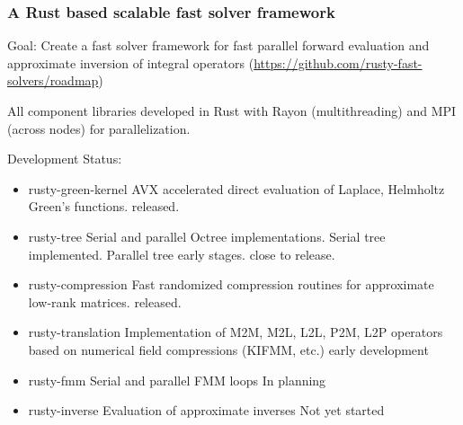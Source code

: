 \documentclass[dvipsnames,10pt]{beamer}
\begin{document}
\begin{frame}
    \frametitle{A Rust based scalable fast solver framework}

    \vspace{.2cm}
    Goal: Create a fast solver framework for fast parallel forward evaluation and
    approximate inversion of integral operators (\url{https://github.com/rusty-fast-solvers/roadmap})

    \vspace{\baselineskip} 

    {\color{blue} All component libraries developed in Rust with Rayon (multithreading)
    and MPI (across nodes) for parallelization.}
    \vspace{\baselineskip}

    Development Status:
    \begin{itemize}
    \item {\color{blue} rusty-green-kernel} AVX accelerated direct evaluation
        of Laplace, Helmholtz Green's functions. {\color{green} released}.
    \item {\color{blue} rusty-tree} Serial and parallel Octree implementations.
        Serial tree implemented. 
        Parallel tree early stages. {\color{yellow} close to release}.
    \item {\color{blue} rusty-compression} Fast randomized compression routines
        for approximate low-rank matrices. {\color{green} released.}
    \item {\color{blue} rusty-translation} Implementation of M2M, 
        M2L, L2L, P2M, L2P operators
        based on numerical field compressions (KIFMM, etc.)
        {\color{yellow} early development}
    \item {\color{blue} rusty-fmm} Serial and parallel FMM loops 
        {\color{red} In planning}
    \item {\color{blue} rusty-inverse} Evaluation of approximate inverses 
        {\color{red} Not yet started}
    \end{itemize}

\end{frame}
\end{document}
